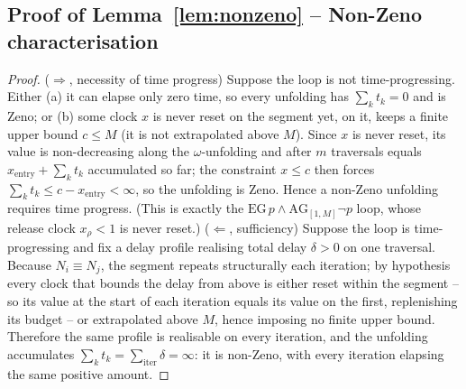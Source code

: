 \subsection{Proof of Lemma~\ref{lem:nonzeno} -- Non-Zeno characterisation}
\begin{proof}
($\Rightarrow$, necessity of time progress) Suppose the loop is {not} time-progressing. Either (a) it can elapse only zero time, so every unfolding has $\sum_k t_k=0$ and is Zeno; or (b) some clock $x$ is never reset on the segment yet, on it, keeps a finite upper bound $c\le M$ (it is not extrapolated above $M$). Since $x$ is never reset, its value is non-decreasing along the $\omega$-unfolding and after $m$ traversals equals $x_{\text{entry}}+\sum_{k} t_k$ accumulated so far; the constraint $x\le c$ then forces $\sum_k t_k\le c-x_{\text{entry}}<\infty$, so the unfolding is Zeno. Hence a non-Zeno unfolding requires time progress. (This is exactly the $\mathrm{EG}\,p\land\mathrm{AG}_{[1,M]}\neg p$ loop, whose release clock $x_\rho<1$ is never reset.)
($\Leftarrow$, sufficiency) Suppose the loop is time-progressing and fix a delay profile realising total delay $\delta>0$ on one traversal. Because $N_i\equiv N_j$, the segment repeats structurally each iteration; by hypothesis every clock that bounds the delay from above is either reset within the segment -- so its value at the start of each iteration equals its value on the first, replenishing its budget -- or extrapolated above $M$, hence imposing no finite upper bound. Therefore the same profile is realisable on every iteration, and the unfolding accumulates $\sum_k t_k=\sum_{\mathrm{iter}}\delta=\infty$: it is non-Zeno, with every iteration elapsing the same positive amount.
\end{proof}


